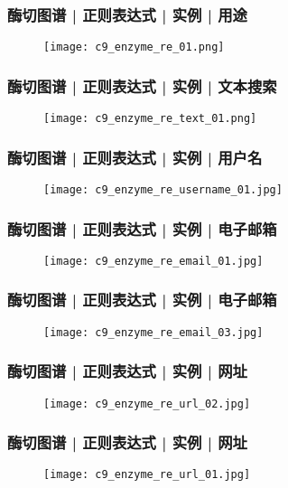 \begin{frame}
  \frametitle{酶切图谱 | 正则表达式 | 实例 | 用途}
  \begin{figure}
    \centering
    \texttt{[image: c9\_enzyme\_re\_01.png]}
  \end{figure}
\end{frame}

\begin{frame}
  \frametitle{酶切图谱 | 正则表达式 | 实例 | 文本搜索}
  \begin{figure}
    \centering
    \texttt{[image: c9\_enzyme\_re\_text\_01.png]}
  \end{figure}
\end{frame}

\begin{frame}
  \frametitle{酶切图谱 | 正则表达式 | 实例 | 用户名}
  \begin{figure}
    \centering
    \texttt{[image: c9\_enzyme\_re\_username\_01.jpg]}
  \end{figure}
\end{frame}

\begin{frame}
  \frametitle{酶切图谱 | 正则表达式 | 实例 | 电子邮箱}
  \begin{figure}
    \centering
    \texttt{[image: c9\_enzyme\_re\_email\_01.jpg]}
  \end{figure}
\end{frame}

\begin{frame}
  \frametitle{酶切图谱 | 正则表达式 | 实例 | 电子邮箱}
  \begin{figure}
    \centering
    \texttt{[image: c9\_enzyme\_re\_email\_03.jpg]}
  \end{figure}
\end{frame}

\begin{frame}
  \frametitle{酶切图谱 | 正则表达式 | 实例 | 网址}
  \begin{figure}
    \centering
    \texttt{[image: c9\_enzyme\_re\_url\_02.jpg]}
  \end{figure}
\end{frame}

\begin{frame}
  \frametitle{酶切图谱 | 正则表达式 | 实例 | 网址}
  \begin{figure}
    \centering
    \texttt{[image: c9\_enzyme\_re\_url\_01.jpg]}
  \end{figure}
\end{frame}

